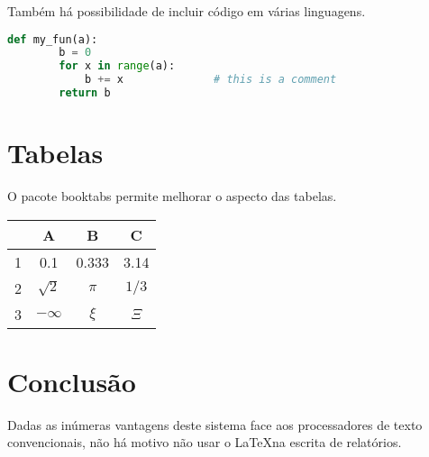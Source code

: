 \documentclass[11pt]{article}   %
\begin{document}
Também há possibilidade de incluir código em várias linguagens.

\begin{lstlisting}[language=Python,caption=Código em Python.]
    def my_fun(a):
        b = 0
        for x in range(a):
            b += x              # this is a comment
        return b
\end{lstlisting}

\section{Tabelas}
\label{sec:tabelas}

O pacote booktabs permite melhorar o aspecto das tabelas.

\begin{center}
    \begin{tabular}{r|ccc}
    \toprule
      & A & B & C \\
    \midrule
    1 & 0.1 & 0.333 & 3.14 \\
    2 & $\sqrt{2}$ & $\pi$ & $1/3$ \\
    3 & $-\infty$ & $\xi$ & $\Xi$ \\
    \bottomrule
    \end{tabular}
\end{center}

\section{Conclusão}
\label{sec:conclusao}

Dadas as inúmeras vantagens deste sistema face aos processadores de texto convencionais, não há motivo não usar o \LaTeX na escrita de relatórios.
\end{document}
